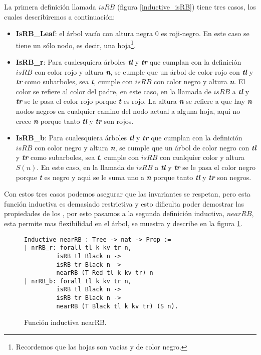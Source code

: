 La primera definici\'on llamada $isRB$ (figura \ref{inductive_isRB}) tiene tres casos, los
cuales describiremos a continuaci\'on:
\begin{itemize}
        \item \textbf{IsRB\_Leaf}: el árbol vacío con altura negra 0 es roji-negro. En este caso
        se tiene un s\'olo nodo, es decir, una hoja\footnote{Recordemos que las hojas son vacias y de
        color negro.}.
        \item \textbf{IsRB\_r}: Para cualesquiera \'arboles \textbf{\textit{tl}} y \textbf{\textit{tr}} que cumplan con la
        definici\'on $isRB$ con color rojo y altura \textbf{\textit{n}}, se cumple que un \'arbol de color rojo con
        \textbf{\textit{tl}} y \textbf{\textit{tr}} como subarboles, sea \textbf{\textit{t}}, cumple con $isRB$ con color negro y altura \textbf{\textit{n}}. El
        color se refiere al color del padre, en este caso, en la llamada de $isRB$ a \textbf{\textit{tl}} y \textbf{\textit{tr}} se
        le pasa el color rojo porque \textbf{\textit{t}} es rojo. La altura \textbf{\textit{n}} se refiere a que hay \textbf{\textit{n}} nodos
        negros en cualquier camino del nodo actual a alguna hoja, aqui no crece \textbf{\textit{n}} porque tanto
        \textbf{\textit{tl}} y \textbf{\textit{tr}} son rojos.
        \item \textbf{IsRB\_b}: Para cualesquiera \'arboles \textbf{\textit{tl}} y \textbf{\textit{tr}} que cumplan con la
        definici\'on $isRB$ con color negro y altura \textbf{\textit{n}}, se cumple que un \'arbol de color negro
        con \textbf{\textit{tl}} y \textbf{\textit{tr}} como subarboles, sea \textbf{\textit{t}}, cumple con $isRB$ con cualquier color y altura
        $S(n)$. En este caso, en la llamada de $isRB$ a \textbf{\textit{tl}} y \textbf{\textit{tr}} se le pasa el color negro
        porque \textbf{\textit{t}} es negro y aqui se le suma uno a \textbf{\textit{n}} porque tanto \textbf{\textit{tl}} y \textbf{\textit{tr}} son negros.
\end{itemize}

Con estos tres casos podemos asegurar que las invariantes se respetan, pero esta funci\'on
inductiva es demasiado restrictiva y esto dificulta poder demostrar las propiedades de los {\arns},
por esto pasamos a la segunda definici\'on inductiva, $nearRB$, esta permite mas flexibilidad en el
\'arbol, se muestra y describe en la figura \ref{inductive_nearRB}.
\begin{figure}[!ht]
\centering
\captionsetup{justification=centering}
\begin{verbatim}
Inductive nearRB : Tree -> nat -> Prop :=
| nrRB_r: forall tl k kv tr n,
         isRB tl Black n ->
         isRB tr Black n ->
         nearRB (T Red tl k kv tr) n
| nrRB_b: forall tl k kv tr n,
         isRB tl Black n ->
         isRB tr Black n ->
         nearRB (T Black tl k kv tr) (S n).
\end{verbatim}
\caption{Funci\'on inductiva nearRB.}
\label{inductive_nearRB}
\end{figure}

